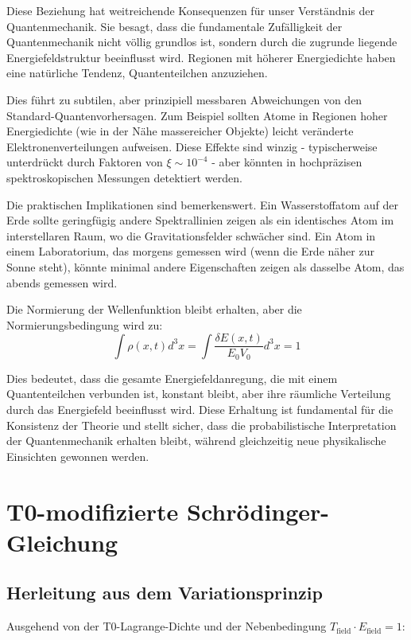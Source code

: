 \documentclass[12pt,a4paper]{article}
\newcommand{\deltaE}{\delta E}
\newcommand{\xipar}{\xi}
\theoremstyle{definition}
\theoremstyle{remark}
\begin{document}
Diese Beziehung hat weitreichende Konsequenzen für unser Verständnis der Quantenmechanik. Sie besagt, dass die fundamentale Zufälligkeit der Quantenmechanik nicht völlig grundlos ist, sondern durch die zugrunde liegende Energiefeldstruktur beeinflusst wird. Regionen mit höherer Energiedichte haben eine natürliche Tendenz, Quantenteilchen anzuziehen.

Dies führt zu subtilen, aber prinzipiell messbaren Abweichungen von den Standard-Quantenvorhersagen. Zum Beispiel sollten Atome in Regionen hoher Energiedichte (wie in der Nähe massereicher Objekte) leicht veränderte Elektronenverteilungen aufweisen. Diese Effekte sind winzig - typischerweise unterdrückt durch Faktoren von $\xipar \sim 10^{-4}$ - aber könnten in hochpräzisen spektroskopischen Messungen detektiert werden.

Die praktischen Implikationen sind bemerkenswert. Ein Wasserstoffatom auf der Erde sollte geringfügig andere Spektrallinien zeigen als ein identisches Atom im interstellaren Raum, wo die Gravitationsfelder schwächer sind. Ein Atom in einem Laboratorium, das morgens gemessen wird (wenn die Erde näher zur Sonne steht), könnte minimal andere Eigenschaften zeigen als dasselbe Atom, das abends gemessen wird.

Die Normierung der Wellenfunktion bleibt erhalten, aber die Normierungsbedingung wird zu:
$$\int \rho(x,t) d^3x = \int \frac{\deltaE(x,t)}{E_0 V_0} d^3x = 1$$

Dies bedeutet, dass die gesamte Energiefeldanregung, die mit einem Quantenteilchen verbunden ist, konstant bleibt, aber ihre räumliche Verteilung durch das Energiefeld beeinflusst wird. Diese Erhaltung ist fundamental für die Konsistenz der Theorie und stellt sicher, dass die probabilistische Interpretation der Quantenmechanik erhalten bleibt, während gleichzeitig neue physikalische Einsichten gewonnen werden.

\section{T0-modifizierte Schrödinger-Gleichung}

\subsection{Herleitung aus dem Variationsprinzip}

Ausgehend von der T0-Lagrange-Dichte und der Nebenbedingung $T_{\text{field}} \cdot E_{\text{field}} = 1$:
\end{document}
